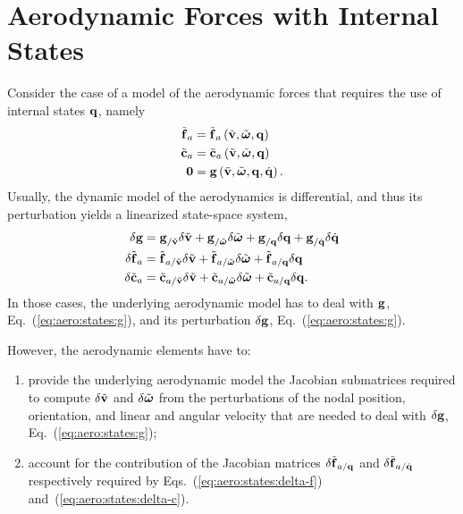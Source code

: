 \section{Aerodynamic Forces with Internal States}
Consider the case of a model of the aerodynamic forces
that requires the use of internal states $\bm{\mathbf{q}}$, namely
\begin{subequations}
\begin{align}
	\tilde{\bm{\mathbf{f}}}_a
	&=
	\tilde{\bm{\mathbf{f}}}_a\left( \tilde{\bm{\mathbf{v}}},\tilde{\bm{\mathbf{\omega}}},\bm{\mathbf{q}} \right)
	\\
	\tilde{\bm{\mathbf{c}}}_a
	&=
	\tilde{\bm{\mathbf{c}}}_a\left( \tilde{\bm{\mathbf{v}}},\tilde{\bm{\mathbf{\omega}}},\bm{\mathbf{q}} \right)
	\\
	\bm{\mathbf{0}}
	&=
	\bm{\mathbf{g}}\left( \tilde{\bm{\mathbf{v}}},\tilde{\bm{\mathbf{\omega}}},\bm{\mathbf{q}}, \dot{\bm{\mathbf{q}}} \right)
	\label{eq:aero:states:g}
	.
\end{align}
\end{subequations}
Usually, the dynamic model of the aerodynamics is differential,
and thus its perturbation yields a linearized state-space system,
\begin{subequations}
\begin{align}
	\delta\bm{\mathbf{g}}
	&=
	\bm{\mathbf{g}}_{/\tilde{\bm{\mathbf{v}}}} \delta\tilde{\bm{\mathbf{v}}}
	+ \bm{\mathbf{g}}_{/\tilde{\bm{\mathbf{\omega}}}} \delta\tilde{\bm{\mathbf{\omega}}}
	+ \bm{\mathbf{g}}_{/\bm{\mathbf{q}}} \delta\bm{\mathbf{q}}
	+ \bm{\mathbf{g}}_{/\dot{\bm{\mathbf{q}}}} \delta\dot{\bm{\mathbf{q}}}
	\label{eq:aero:states:delta-g}
	\\
	\delta \tilde{\bm{\mathbf{f}}}_a
	&=
	\tilde{\bm{\mathbf{f}}}_{a/\tilde{\bm{\mathbf{v}}}} \delta\tilde{\bm{\mathbf{v}}}
	+ \tilde{\bm{\mathbf{f}}}_{a/\tilde{\bm{\mathbf{\omega}}}} \delta\tilde{\bm{\mathbf{\omega}}}
	+ \tilde{\bm{\mathbf{f}}}_{a/\bm{\mathbf{q}}} \delta\bm{\mathbf{q}}
	\label{eq:aero:states:delta-f}
	\\
	\delta \tilde{\bm{\mathbf{c}}}_a
	&=
	\tilde{\bm{\mathbf{c}}}_{a/\tilde{\bm{\mathbf{v}}}} \delta\tilde{\bm{\mathbf{v}}}
	+ \tilde{\bm{\mathbf{c}}}_{a/\tilde{\bm{\mathbf{\omega}}}} \delta\tilde{\bm{\mathbf{\omega}}}
	+ \tilde{\bm{\mathbf{c}}}_{a/\bm{\mathbf{q}}} \delta\bm{\mathbf{q}}
	\label{eq:aero:states:delta-c}
	.
\end{align}
\end{subequations}
In those cases, the underlying aerodynamic model has
to deal with $\bm{\mathbf{g}}$, Eq.~(\ref{eq:aero:states:g}),
and its perturbation $\delta\bm{\mathbf{g}}$, Eq.~(\ref{eq:aero:states:g}).

However, the aerodynamic elements have to:
\begin{enumerate}

\item provide the underlying aerodynamic model the Jacobian submatrices
required to compute $\delta\tilde{\bm{\mathbf{v}}}$ and $\delta\tilde{\bm{\mathbf{\omega}}}$
from the perturbations of the nodal position, orientation,
and linear and angular velocity that are needed to deal with $\delta\bm{\mathbf{g}}$,
Eq.~(\ref{eq:aero:states:g});

\item account for the contribution of the Jacobian matrices
$\delta\tilde{\bm{\mathbf{f}}}_{a/\bm{\mathbf{q}}}$ and $\delta\tilde{\bm{\mathbf{f}}}_{a/\dot{\bm{\mathbf{q}}}}$
respectively required by Eqs.~(\ref{eq:aero:states:delta-f})
and~(\ref{eq:aero:states:delta-c}).
\end{enumerate}





